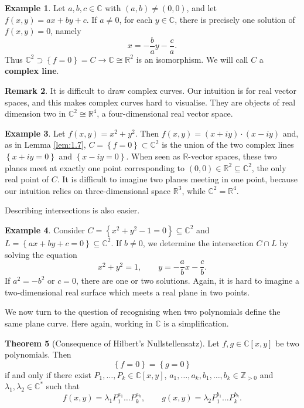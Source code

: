 \documentclass{article}
\newcommand{\Z}{\mathbb{Z}}
\newcommand{\R}{\mathbb{R}}
\newcommand{\C}{\mathbb{C}}
\newcommand{\rb}[1]{\left( #1 \right)}
\renewcommand{\sb}[1]{\left[ #1 \right]}
\newcommand{\cb}[1]{\left\{ #1 \right\}}
\theoremstyle{definition}\newtheorem{definition}{Definition}[section]
\theoremstyle{definition}\newtheorem{notation}[definition]{Notation}
\theoremstyle{definition}\newtheorem{remark}[definition]{Remark}
\theoremstyle{definition}\newtheorem{example}[definition]{Example}
\theoremstyle{definition}\newtheorem{fact}{Fact}
\theoremstyle{definition}\newtheorem{exercise}{Exercise}
\newtheorem{theorem}[definition]{Theorem}
\begin{document}
\begin{example}
Let $ a, b, c \in \C $ with $ \rb{a, b} \ne \rb{0, 0} $, and let $ f\rb{x, y} = ax + by + c $. If $ a \ne 0 $, for each $ y \in \C $, there is precisely one solution of $ f\rb{x, y} = 0 $, namely
$$ x = -\dfrac{b}{a}y - \dfrac{c}{a}. $$
Thus $ \C^2 \supset \cb{f = 0} = C \to \C \cong \R^2 $ is an isomorphism. We will call $ C $ a \textbf{complex line}.
\end{example}

\begin{remark}
It is difficult to draw complex curves. Our intuition is for real vector spaces, and this makes complex curves hard to visualise. They are objects of real dimension two in $ \C^2 \cong \R^4 $, a four-dimensional real vector space.
\end{remark}

\begin{example}
Let $ f\rb{x, y} = x^2 + y^2 $. Then $ f\rb{x, y} = \rb{x + iy} \cdot \rb{x - iy} $ and, as in Lemma \ref{lem:1.7}, $ C = \cb{f = 0} \subset \C^2 $ is the union of the two complex lines $ \cb{x + iy = 0} $ and $ \cb{x - iy = 0} $. When seen as $ \R $-vector spaces, these two planes meet at exactly one point corresponding to $ \rb{0, 0} \in \R^2 \subseteq \C^2 $, the only real point of $ C $. It is difficult to imagine two planes meeting in one point, because our intuition relies on three-dimensional space $ \R^3 $, while $ \C^2 = \R^4 $.
\end{example}

Describing intersections is also easier.

\begin{example}
Consider $ C = \cb{x^2 + y^2 - 1 = 0} \subseteq \C^2 $ and $ L = \cb{ax + by + c = 0} \subseteq \C^2 $. If $ b \ne 0 $, we determine the intersection $ C \cap L $ by solving the equation
$$ x^2 + y^2 = 1, \qquad y = -\dfrac{a}{b}x - \dfrac{c}{b}. $$
If $ a^2 = -b^2 $ or $ c = 0 $, there are one or two solutions. Again, it is hard to imagine a two-dimensional real surface which meets a real plane in two points.
\end{example}

We now turn to the question of recognising when two polynomials define the same plane curve. Here again, working in $ \C $ is a simplification.

\begin{theorem}[Consequence of Hilbert's Nullstellensatz]
\label{thm:2.9}
Let $ f, g \in \C\sb{x, y} $ be two polynomials. Then
$$ \cb{f = 0} = \cb{g = 0} $$
if and only if there exist $ P_1, \dots, P_k \in \C\sb{x, y} $, $ a_1, \dots, a_k, b_1, \dots, b_k \in \Z_{> 0} $ and $ \lambda_1, \lambda_2 \in \C^* $ such that
\begin{equation}
\label{eq:2}
f\rb{x, y} = \lambda_1 P_1^{a_1} \dots P_k^{a_k}, \qquad g\rb{x, y} = \lambda_2 P_1^{b_1} \dots P_k^{b_k}.
\end{equation}
\end{theorem}
\end{document}
